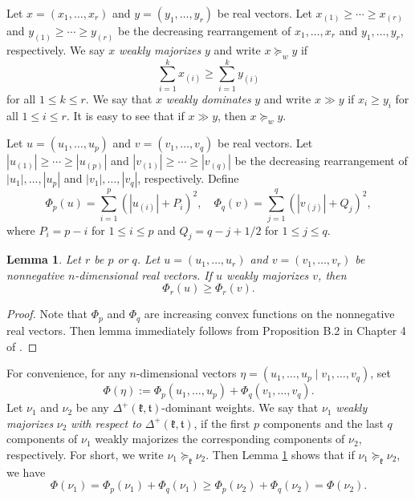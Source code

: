 \documentclass[11pt]{amsart}
\theoremstyle{plain}
\newtheorem{lemma}[thm]{Lemma}
\theoremstyle{definition}
\newcommand{\mfk}{\mathfrak{k}}
\newcommand{\mft}{\mathfrak{t}}
\begin{document}
Let  $x=(x_1,\dots,x_r)$ and $y=(y_1,\dots,y_r)$ be real vectors. Let $x_{(1)}\ge \cdots \ge x_{(r)}$ and $y_{(1)}\ge \cdots \ge y_{(r)}$ be the decreasing rearrangement of $x_1,\dots,x_r$ and $y_{1},\dots,y_r$, respectively. We say $x$ \emph{weakly majorizes} $y$ and write $x \succeq_w y$ if
\[\sum_{i=1}^{k}x_{(i)}\ge \sum_{i=1}^k y_{(i)}\]
for all $1\le k\le r$. We say that $x$  \emph{weakly dominates} $y$ and write $x\gg y$ if $x_i\ge y_i$ for all $1\le i\le r$. It is easy to see that if $x\gg y$, then $x\succeq_w y$.

Let  $u=(u_1,\dots,u_p)$ and $v=(v_1,\dots,v_q)$ be real vectors. Let $|u_{(1)}|\ge \cdots \ge |u_{(p)}|$ and $|v_{(1)}|\ge \cdots \ge |v_{(q)}|$ be the decreasing rearrangement of $|u_1|,\dots,|u_p|$ and $|v_{1}|,\dots,|v_q|$, respectively. Define
\[\Phi_p(u)=\sum_{i=1}^p(|u_{(i)}|+P_i)^2,\quad \Phi_q(v)=\sum_{j=1}^q(|v_{(j)}|+Q_j)^2,\]
where $P_i=p-i$ for $1\le i\le p$ and $Q_j=q-j+1/2$ for $1\le j\le q$.
\begin{lemma}\label{Phi}
	Let $r$ be $p$ or $q$. Let $u=(u_1,\dots,u_r)$ and $v=(v_1,\dots,v_r)$ be nonnegative $n$-dimensional real vectors. If $u$ weakly majorizes $v$, then
	\[\Phi_r(u)\ge \Phi_r(v).\]
\end{lemma}
\begin{proof}
	Note that $\Phi_p$ and $\Phi_q$ are increasing convex functions on the nonnegative real vectors. Then lemma immediately follows from Proposition B.2 in Chapter 4 of \cite{MI}.
\end{proof}
For convenience, for any $n$-dimensional vectors $\eta=(u_1,\dots,u_p\mid v_1,\dots,v_q)$, set
\begin{equation}\label{Phi-eta}
\Phi(\eta):=\Phi_p(u_1,\dots,u_p)+\Phi_q(v_1,\dots,v_q).
\end{equation}
Let $\nu_1$ and $\nu_2$ be any $\Delta^+(\mfk,\mft)$-dominant weights. We say that $\nu_1$ \emph{weakly majorizes} $\nu_2$ \emph{with respect to} $\Delta^+(\mfk,\mft)$, if the first $p$ components and the last $q$ components of $\nu_1$ weakly majorizes the corresponding components of $\nu_2$, respectively. For short, we write $\nu_1\succeq_\mfk \nu_2$. Then Lemma \ref{Phi} shows that if $\nu_1\succeq_\mfk \nu_2$, we have
\begin{equation}\label{compare-spin}
	\Phi(\nu_1)=\Phi_p(\nu_1)+\Phi_q(\nu_1)\ge \Phi_p(\nu_2)+\Phi_q(\nu_2)=\Phi(\nu_2).
\end{equation}
\end{document}
